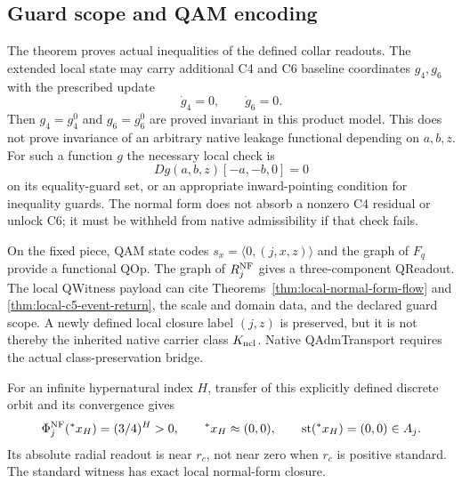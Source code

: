\documentclass[11pt,a4paper]{article}
\begin{document}
\subsection{Guard scope and QAM encoding}
The theorem proves actual inequalities of the defined collar readouts.
The extended local state may carry additional C4 and C6 baseline coordinates
$g_4,g_6$ with the prescribed update
\[
\dot g_4=0,\qquad\dot g_6=0.
\]
Then $g_4=g_4^0$ and $g_6=g_6^0$ are proved invariant in this product model.
This does not prove invariance of an arbitrary native leakage functional
depending on $a,b,z$. For such a function $g$ the necessary local check is
\[
Dg(a,b,z)[-a,-b,0]=0
\]
on its equality-guard set, or an appropriate inward-pointing condition for
inequality guards. The normal form does not absorb a nonzero C4 residual
or unlock C6; it must be withheld from native admissibility if that check fails.

On the fixed piece, QAM state codes $s_x=\langle0,(j,x,z)\rangle$ and the
graph of $F_q$ provide a functional QOp. The graph of $R_j^{\rm NF}$ gives
a three-component QReadout. The local QWitness payload can cite
Theorems~\ref{thm:local-normal-form-flow} and
\ref{thm:local-c5-event-return}, the scale and domain data, and the declared
guard scope. A newly defined local closure label $(j,z)$ is preserved, but
it is not thereby the inherited native carrier class $K_{\rm ncl}$.
Native QAdmTransport requires the actual class-preservation bridge.

For an infinite hypernatural index $H$, transfer of this explicitly defined
discrete orbit and its convergence gives
\[
\Phi^{\rm NF}_j({}^*x_H)=(3/4)^H>0,
\qquad {}^*x_H\approx(0,0),\qquad
\operatorname{st}({}^*x_H)=(0,0)\in A_j.
\]
Its absolute radial readout is near $r_c$, not near zero when $r_c$ is
positive standard. The standard witness has exact local normal-form closure.
\end{document}
